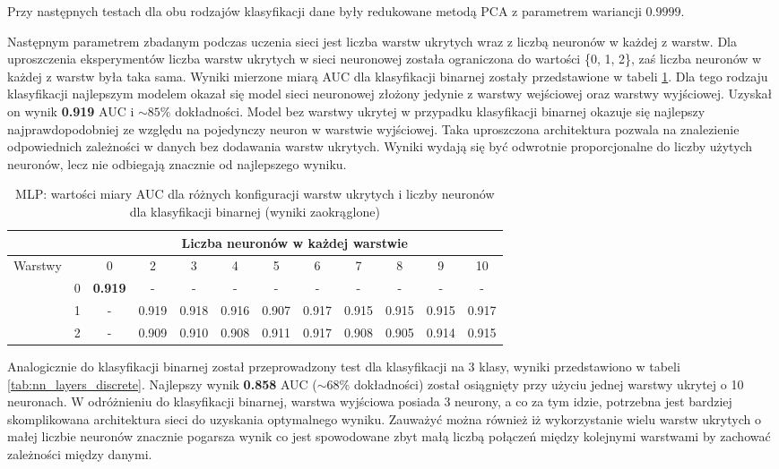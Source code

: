 \documentclass[a4paper, twoside, 11pt, openright]{article}
\begin{document}
Przy następnych testach dla obu rodzajów klasyfikacji dane były redukowane metodą PCA z parametrem wariancji $0.9999$. 

\bigskip

Następnym parametrem zbadanym podczas uczenia sieci jest liczba warstw ukrytych wraz z liczbą neuronów w każdej z warstw. Dla uproszczenia eksperymentów liczba warstw ukrytych w sieci neuronowej została ograniczona do wartości \{0, 1, 2\}, zaś liczba neuronów w każdej z warstw była taka sama. Wyniki mierzone miarą AUC dla klasyfikacji binarnej zostały przedstawione w tabeli \ref{tab:nn_layers_binary}. Dla tego rodzaju klasyfikacji najlepszym modelem okazał się model sieci neuronowej złożony jedynie z warstwy wejściowej oraz warstwy wyjściowej. Uzyskał on wynik \textbf{0.919} AUC i $\sim 85\%$ dokładności. Model bez warstwy ukrytej w przypadku klasyfikacji binarnej okazuje się najlepszy najprawdopodobniej ze względu na pojedynczy neuron w warstwie wyjściowej. Taka uproszczona architektura pozwala na znalezienie odpowiednich zależności w danych bez dodawania warstw ukrytych. Wyniki wydają się być odwrotnie proporcjonalne do liczby użytych neuronów, lecz nie odbiegają znacznie od najlepszego wyniku.

\begin{table}[H]
    \centering
    \begin{tabular}{|c|c|c|c|c|c|c|c|c|c|c|c|}
        \hline
         & &  \multicolumn{10}{c|}{Liczba neuronów w każdej warstwie}  \\ \hline
        \multirow{4}{*}{Warstwy} & & 0 & 2 & 3 & 4 & 5 & 6 & 7 & 8 & 9 & 10  \\ \cline{2 - 12}
			& 0 & \textbf{0.919} & - & - & - & - & - & - & - & - & - \\ \cline{2 - 12} 
			& 1 & - &  0.919 &  0.918 &  0.916 &  0.907 &  0.917 &  0.915 &  0.915 &  0.915  & 0.917 \\ \cline{2 - 12} 
			& 2 & - & 0.909 &    0.910 &   0.908 &   0.911 &   0.917 &   0.908 &   0.905 &   0.914 & 0.915 \\ \cline{2 - 12} \hline

    \end{tabular}
    \caption{MLP: wartości miary AUC dla różnych konfiguracji warstw ukrytych i liczby neuronów dla klasyfikacji binarnej (wyniki zaokrąglone)}
    \label{tab:nn_layers_binary}
\end{table}

Analogicznie do klasyfikacji binarnej został przeprowadzony test dla klasyfikacji na 3 klasy, wyniki przedstawiono w tabeli \ref{tab:nn_layers_discrete}. Najlepszy wynik \textbf{0.858} AUC ($\sim 68\%$ dokładności) został osiągnięty przy użyciu jednej warstwy ukrytej o 10 neuronach. W odróżnieniu do klasyfikacji binarnej, warstwa wyjściowa posiada 3 neurony, a co za tym idzie, potrzebna jest bardziej skomplikowana architektura sieci do uzyskania optymalnego wyniku. Zauważyć można również iż wykorzystanie wielu warstw ukrytych o małej liczbie neuronów znacznie pogarsza wynik co jest spowodowane zbyt małą liczbą połączeń między kolejnymi warstwami by zachować zależności między danymi.
\end{document}
